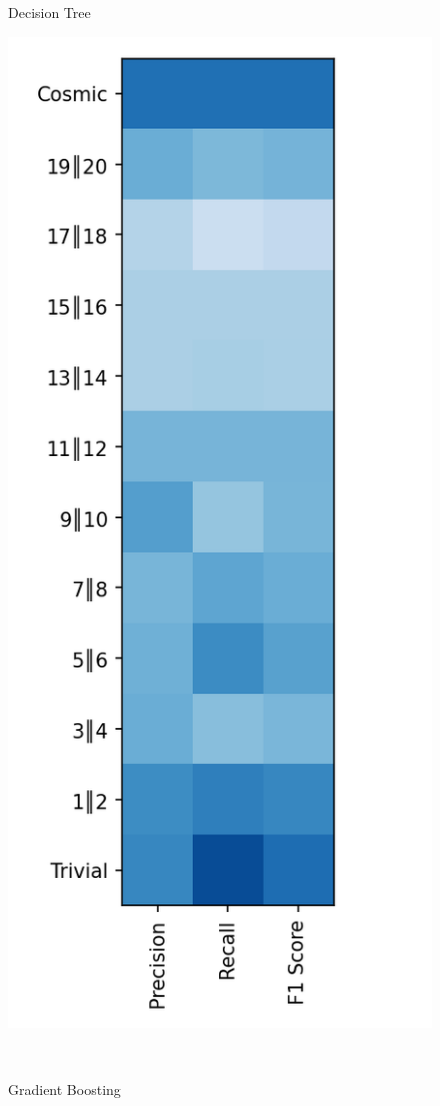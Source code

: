 \documentclass{article}
\begin{document}
\begin{figure}[ht]
\begin{minipage}[b]{0.32\linewidth}
			\caption*{Decision Tree} 
			\vspace{10ex}
		\end{minipage}\hfill
		\begin{minipage}[b]{0.32\linewidth}
			\centering
			\includegraphics[width=\linewidth]{12 - Gradient Boosting.png} 
			\caption*{Gradient Boosting} 
			\vspace{10ex}
		\end{minipage} \\


\end{figure}
\end{document}
